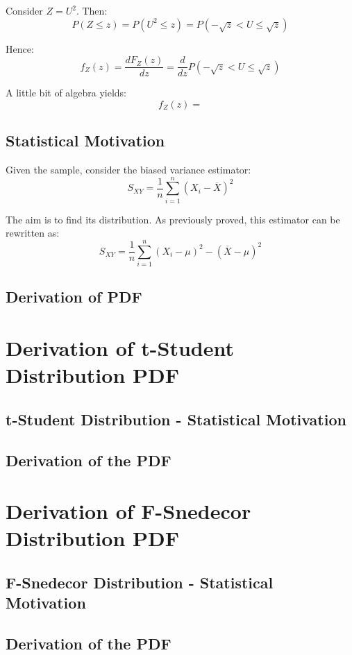 \documentclass[12pt]{article}
\begin{document}
Consider $Z = U^2$. Then:
\begin{equation*}
P(Z \leq z) = P(U^2 \leq z) = P(-\sqrt{z} < U \leq \sqrt{z})
\end{equation*}

Hence:
\begin{equation*}
f_{Z}(z) = \frac{dF_{Z}(z)}{dz} = \frac{d}{dz} P(-\sqrt{z} < U \leq \sqrt{z})
\end{equation*}

A little bit of algebra yields:
\begin{equation*}
f_{Z}(z) = 
\end{equation*}



\subsection{Statistical Motivation}
Given the sample, consider the biased variance estimator:
\begin{equation*}
S_{XY} = \frac{1}{n} \sum_{i=1}^{n} (X_i - \overline{X})^2 
\end{equation*}

The aim is to find its distribution. As previously proved, this estimator can be rewritten as:
\begin{equation*}
S_{XY} = \frac{1}{n} \sum_{i=1}^{n} (X_i - \mu)^2 - (\overline{X} - \mu)^2
\end{equation*}


\subsection{Derivation of PDF}

\section{Derivation of t-Student Distribution PDF}
\subsection{t-Student Distribution - Statistical Motivation}

\subsection{Derivation of the PDF}

\section{Derivation of F-Snedecor Distribution PDF}
\subsection{F-Snedecor Distribution - Statistical Motivation}
\subsection{Derivation of the PDF}



\end{document}
